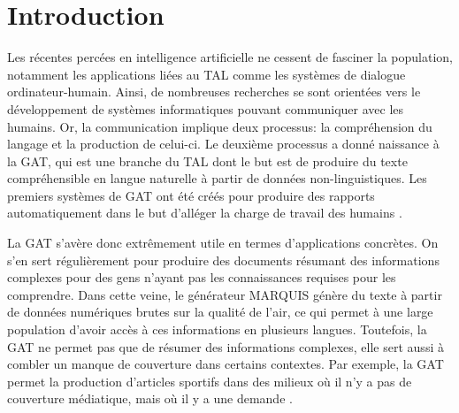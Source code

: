 
\chapter*{Introduction}



Les récentes percées en intelligence artificielle ne cessent de fasciner la population, notamment les applications liées au \acf{TAL} comme les systèmes de dialogue ordinateur-humain. Ainsi, de nombreuses recherches se sont orientées vers le développement de systèmes informatiques pouvant communiquer avec les humains. Or, la communication implique deux processus: la compréhension du langage et la production de celui-ci. Le deuxième processus a donné naissance à la \acf{GAT}, qui est une branche du \ac{TAL} dont le but est de produire du texte compréhensible en langue naturelle à partir de données non-linguistiques. Les premiers systèmes de \ac{GAT} ont été créés pour produire des rapports automatiquement dans le but d'alléger la charge de travail des humains \citep{ReiterBuildingNaturalLanguage2000}.

La \ac{GAT} s'avère donc extrêmement utile en termes d'applications concrètes. On s'en sert régulièrement pour produire des documents résumant des informations complexes pour des gens n'ayant pas les connaissances requises pour les comprendre. Dans cette veine, le générateur MARQUIS \citep{WannerMARQUISGENERATIONUSERTAILORED2010} génère du texte à partir de données numériques brutes sur la qualité de l'air, ce qui permet à une large population d'avoir accès à ces informations en plusieurs langues. Toutefois, la \ac{GAT} ne permet pas que de résumer des informations complexes, elle sert aussi à combler un manque de couverture dans certains contextes. Par exemple, la \ac{GAT} permet la production d'articles sportifs dans des milieux où il n'y a pas de couverture médiatique, mais où il y a une demande \citep{lareau11a,W17-3513}.

